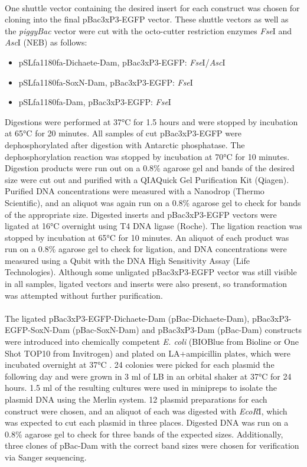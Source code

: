 \paragraph{}
One shuttle vector containing the desired insert for each construct was chosen for cloning into the final pBac{3xP3-EGFP} vector. These shuttle vectors as well as the \emph{piggyBac} vector were cut with the octo-cutter restriction enzymes \emph{Fse}I and \emph{Asc}I (NEB) as follows:  
\begin{itemize}
	\item pSLfa1180fa-Dichaete-Dam, pBac{3xP3-EGFP}: \emph{Fse}I/\emph{Asc}I
	\item pSLfa1180fa-SoxN-Dam, pBac{3xP3-EGFP}: \emph{Fse}I
	\item pSLfa1180fa-Dam, pBac{3xP3-EGFP}: \emph{Fse}I
\end{itemize}
Digestions were performed at 37°C for 1.5 hours and were stopped by incubation at 65°C for 20 minutes. All samples of cut pBac{3xP3-EGFP} were dephosphorylated after digestion with Antarctic phosphatase. The dephosphorylation reaction was stopped by incubation at 70°C for 10 minutes. Digestion products were run out on a 0.8\% agarose gel and bands of the desired size were cut out and purified with a QIAQuick Gel Purification Kit (Qiagen). Purified DNA concentrations were measured with a Nanodrop (Thermo Scientific), and an aliquot was again run on a 0.8\% agarose gel to check for bands of the appropriate size. Digested inserts and pBac{3xP3-EGFP} vectors were ligated at 16°C overnight using T4 DNA ligase (Roche). The ligation reaction was stopped by incubation at 65°C for 10 minutes. An aliquot of each product was run on a 0.8\% agarose gel to check for ligation, and DNA concentrations were measured using a Qubit with the DNA High Sensitivity Assay (Life Technologies). Although some unligated pBac{3xP3-EGFP} vector was still visible in all samples, ligated vectors and inserts were also present, so transformation was attempted without further purification.
\paragraph{}
The ligated pBac{3xP3-EGFP}-Dichaete-Dam (pBac-Dichaete-Dam), pBac{3xP3-EGFP}-SoxN-Dam (pBac-SoxN-Dam) and pBac{3xP3}-Dam (pBac-Dam) constructs were introduced into chemically competent \emph{E. coli} (BIOBlue from Bioline or One Shot TOP10 from Invitrogen) and plated on LA+ampicillin plates, which were incubated overnight at 37°C . 24 colonies were picked for each plasmid the following day and were grown in 3 ml of LB in an orbital shaker at 37°C for 24 hours. 1.5 ml of the resulting cultures were used in minipreps to isolate the plasmid DNA using the Merlin system. 12 plasmid preparations for each construct were chosen, and an aliquot of each was digested with \emph{EcoR}I, which was expected to cut each plasmid in three places. Digested DNA was run on a 0.8\% agarose gel to check for three bands of the expected sizes. Additionally, three clones of pBac-Dam with the correct band sizes were chosen for verification via Sanger sequencing.
